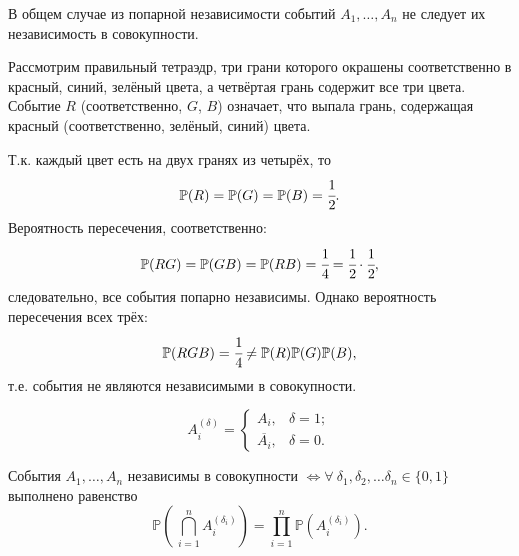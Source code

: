 \begin{rmrk}
    В общем случае из попарной независимости событий $A_1, \ldots, A_n$ не следует их независимость в совокупности.
    \begin{exmp}
        Рассмотрим правильный тетраэдр, три грани которого окрашены соответственно в красный, синий, зелёный цвета, а четвёртая грань содержит все три цвета. 
        Событие $R$ (соответственно, $G$, $B$) означает, что выпала грань, содержащая красный (соответственно, зелёный, синий) цвета.

        Т.к. каждый цвет есть на двух гранях из четырёх, то
        \begin{equation*}
            \mathbb{P}(R) = \mathbb{P}(G) = \mathbb{P}(B) = \cfrac{1}{2}.
        \end{equation*}
        Вероятность пересечения, соответственно:
        \begin{equation*}
            \mathbb{P}(RG) = \mathbb{P}(GB) = \mathbb{P}(RB) = \cfrac{1}{4} = \cfrac{1}{2} \cdot \cfrac{1}{2},
        \end{equation*}
        следовательно, все события попарно независимы. 
        Однако вероятность пересечения всех трёх:
        \begin{equation*}
            \mathbb{P}(RGB)  = \cfrac{1}{4} \neq \mathbb{P}(R) \mathbb{P}(G) \mathbb{P}(B),
        \end{equation*}
        т.е. события не являются независимыми в совокупности. 
    \end{exmp}
\end{rmrk}

\begin{symb}
    \begin{equation*}
        A_{i}^{(\delta)} =
        \begin{cases}
            A_{i}, & \delta = 1; \\
            \overline{A_{i}}, & \delta = 0.
        \end{cases}
    \end{equation*}
\end{symb}

\begin{namedthm}
    События $A_1, \ldots, A_n$ независимы в совокупности $\Leftrightarrow \forall ~ \delta_1, \delta_2, \ldots \delta_n \in \{0, 1\}$ выполнено равенство
    \begin{equation*}
        \mathbb{P}\left(\, \bigcap_{i=1}^{n} A_{i}^{\left( \delta_{i} \right)} \right)
        = \prod_{i=1}^{n}\mathbb{P}\left( A_{i}^{\left(\delta_{i}\right)} \right).
    \end{equation*}
\end{namedthm}

